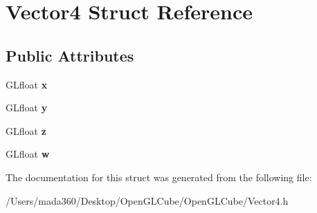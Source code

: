 \hypertarget{struct_vector4}{}\section{Vector4 Struct Reference}
\label{struct_vector4}
\subsection*{Public Attributes}
\begin{DoxyCompactItemize}
\item 
\hypertarget{struct_vector4_a217098b33e968a26b5e6ff481ee04cf7}{}G\+Lfloat {\bfseries x}\label{struct_vector4_a217098b33e968a26b5e6ff481ee04cf7}

\item 
\hypertarget{struct_vector4_a91f362cb35f1d3f37b29967450f45cd5}{}G\+Lfloat {\bfseries y}\label{struct_vector4_a91f362cb35f1d3f37b29967450f45cd5}

\item 
\hypertarget{struct_vector4_afb1e3f931f0e733c93f867d3f16cce75}{}G\+Lfloat {\bfseries z}\label{struct_vector4_afb1e3f931f0e733c93f867d3f16cce75}

\item 
\hypertarget{struct_vector4_afa300dc6085acd21cc95b44118ef42af}{}G\+Lfloat {\bfseries w}\label{struct_vector4_afa300dc6085acd21cc95b44118ef42af}

\end{DoxyCompactItemize}


The documentation for this struct was generated from the following file\+:\begin{DoxyCompactItemize}
\item 
/\+Users/mada360/\+Desktop/\+Open\+G\+L\+Cube/\+Open\+G\+L\+Cube/Vector4.\+h\end{DoxyCompactItemize}
